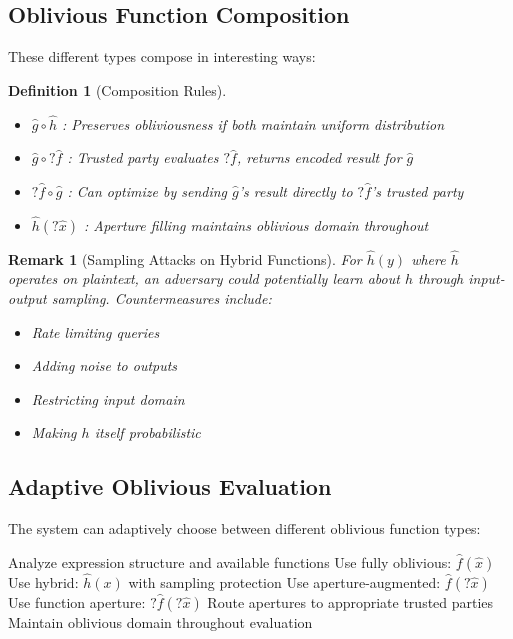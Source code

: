 \documentclass[12pt]{article}
\newtheorem{definition}[theorem]{Definition}
\newtheorem{remark}[theorem]{Remark}
\begin{document}
\subsection{Oblivious Function Composition}

These different types compose in interesting ways:

\begin{definition}[Composition Rules]
\begin{itemize}
    \item $\hat{g} \circ \hat{h}$ : Preserves obliviousness if both maintain uniform distribution
    \item $\hat{g} \circ ?\hat{f}$ : Trusted party evaluates $?\hat{f}$, returns encoded result for $\hat{g}$
    \item $?\hat{f} \circ \hat{g}$ : Can optimize by sending $\hat{g}$'s result directly to $?\hat{f}$'s trusted party
    \item $\hat{h}(?\hat{x})$ : Aperture filling maintains oblivious domain throughout
\end{itemize}
\end{definition}

\begin{remark}[Sampling Attacks on Hybrid Functions]
For $\hat{h}(y)$ where $\hat{h}$ operates on plaintext, an adversary could potentially learn about $h$ through input-output sampling. Countermeasures include:
\begin{itemize}
    \item Rate limiting queries
    \item Adding noise to outputs
    \item Restricting input domain
    \item Making $h$ itself probabilistic
\end{itemize}
\end{remark}

\subsection{Adaptive Oblivious Evaluation}

The system can adaptively choose between different oblivious function types:

\begin{algorithm}
\caption{Adaptive Aperture Evaluation}
\begin{algorithmic}[1]
\State Analyze expression structure and available functions
    \State Use fully oblivious: $\hat{f}(\hat{x})$
    \State Use hybrid: $\hat{h}(x)$ with sampling protection
    \State Use aperture-augmented: $\hat{f}(?\hat{x})$
    \State Use function aperture: $?\hat{f}(?\hat{x})$
\EndIf
\State Route apertures to appropriate trusted parties
\State Maintain oblivious domain throughout evaluation
\end{algorithmic}
\end{algorithm}
\end{document}
